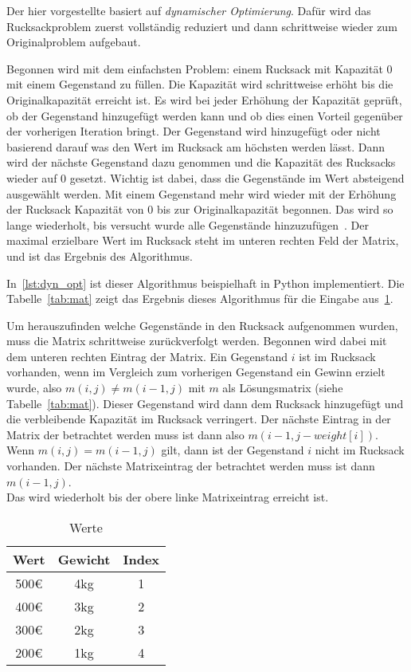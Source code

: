 \documentclass[12pt, a4paper, ngerman]{article}
\begin{document}
Der hier vorgestellte basiert auf \emph{dynamischer Optimierung}.
Dafür wird das Rucksackproblem zuerst vollständig reduziert
und dann schrittweise wieder zum Originalproblem aufgebaut.

Begonnen wird mit dem einfachsten Problem: einem Rucksack mit Kapazität 0 mit einem Gegenstand zu füllen.
Die Kapazität wird schrittweise erhöht bis die Originalkapazität erreicht ist.
Es wird bei jeder Erhöhung der Kapazität geprüft, ob der Gegenstand hinzugefügt werden kann
und ob dies einen Vorteil gegenüber der vorherigen Iteration bringt.
Der Gegenstand wird hinzugefügt oder nicht basierend darauf was den Wert im Rucksack am höchsten werden lässt.
Dann wird der nächste Gegenstand dazu genommen und die Kapazität des Rucksacks wieder auf 0 gesetzt.
Wichtig ist dabei, dass die Gegenstände im Wert absteigend ausgewählt werden.
Mit einem Gegenstand mehr wird wieder mit der Erhöhung der Rucksack Kapazität von 0 bis zur Originalkapazität begonnen.
Das wird so lange wiederholt, bis versucht wurde alle Gegenstände hinzuzufügen~\cite{scheiterhauer2008}.
Der maximal erzielbare Wert im Rucksack steht im unteren rechten Feld der Matrix,
und ist das Ergebnis des Algorithmus.

In~\ref{lst:dyn_opt} ist dieser Algorithmus beispielhaft in Python implementiert.
Die Tabelle~\ref{tab:mat} zeigt das Ergebnis dieses Algorithmus für die Eingabe aus~\ref{tab:input}.

Um herauszufinden welche Gegenstände in den Rucksack aufgenommen wurden,
muss die Matrix schrittweise zurückverfolgt werden.
Begonnen wird dabei mit dem unteren rechten Eintrag der Matrix.
Ein Gegenstand \(i\) ist im Rucksack vorhanden,
wenn im Vergleich zum vorherigen Gegenstand ein Gewinn erzielt wurde,
also \(m(i,j)\neq m(i-1,j)\) mit \(m\) als Lösungsmatrix (siehe Tabelle~\ref{tab:mat}).
Dieser Gegenstand wird dann dem Rucksack hinzugefügt
und die verbleibende Kapazität im Rucksack verringert.
Der nächste Eintrag in der Matrix der betrachtet werden muss
ist dann also \(m(i-1,j-weight[i])\).\\
Wenn \(m(i,j) = m(i-1,j)\) gilt,
dann ist der Gegenstand \(i\) nicht im Rucksack vorhanden.
Der nächste Matrixeintrag der betrachtet werden muss ist dann \(m(i-1,j)\).\\
Das wird wiederholt bis der obere linke Matrixeintrag erreicht ist.


\begin{table}
  \renewcommand{\arraystretch}{1.2}
  \centering
  \begin{tabular}{c|c|c}
    Wert & Gewicht & Index \\
    \hline
    500€ & 4kg     & 1     \\
    400€ & 3kg     & 2     \\
    300€ & 2kg     & 3     \\
    200€ & 1kg     & 4
  \end{tabular}
  \caption{Werte}
  \label{tab:input}
\end{table}
\end{document}

